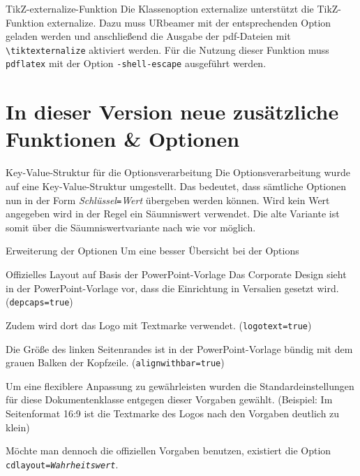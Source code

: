 \documentclass[ngerman,%
	aspectratio=169,%
	colors={rz,faculties},%
	framenumber=true,%
	externalize=true,
	]{URbeamer}
\newcommand*\code[1]{\texttt{#1}}
\begin{document}
\begin{frame}{TikZ-externalize-Funktion}
	Die Klassenoption externalize unterstützt die TikZ-Funktion \glqq{}externalize\grqq. Dazu muss URbeamer mit der entsprechenden Option geladen werden und anschließend die Ausgabe der pdf-Dateien mit \code{\textbackslash{}tiktexternalize} aktiviert werden. Für die Nutzung dieser Funktion muss \code{pdflatex} mit  der Option \code{-shell-escape} ausgeführt werden.
\end{frame}

\part{In dieser Version neue zusätzliche Funktionen \& Optionen}

\begin{frame}{Key-Value-Struktur für die Optionsverarbeitung}
	Die Optionsverarbeitung wurde auf eine Key-Value-Struktur umgestellt. Das bedeutet, dass sämtliche Optionen nun in der Form \textit{Schlüssel}\code{=}\textit{Wert} übergeben werden können. Wird kein Wert angegeben wird in der Regel ein Säumniswert verwendet. Die alte Variante ist somit über die Säumniswertvariante nach wie vor möglich.
\end{frame}

\begin{frame}{Erweiterung der Optionen}
	Um eine besser Übersicht bei der Options
\end{frame}

\begin{frame}{Offizielles Layout auf Basis der PowerPoint-Vorlage}
\small
Das Corporate Design sieht in der PowerPoint-Vorlage vor, dass die Einrichtung in Versalien gesetzt wird.(\code{depcaps=true})

\smallskip
Zudem wird dort das Logo mit Textmarke verwendet. (\code{logotext=true})

\smallskip
Die Größe des linken Seitenrandes ist in der PowerPoint-Vorlage bündig mit dem grauen Balken der Kopfzeile. (\code{alignwithbar=true})

\medskip
Um eine flexiblere Anpassung zu gewährleisten wurden die Standardeinstellungen für diese Dokumentenklasse entgegen dieser Vorgaben gewählt.
(Beispiel: Im Seitenformat 16:9 ist die Textmarke des Logos nach den Vorgaben deutlich zu klein)

\smallskip
Möchte man dennoch die offiziellen Vorgaben benutzen, existiert die Option \code{cdlayout=\textit{Wahrheitswert}}.
\end{frame}
\end{document}

